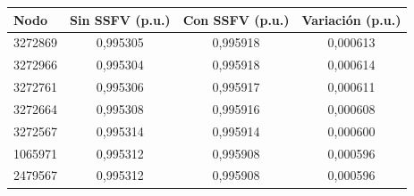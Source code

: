 \begin{tabular}{lccc}
\toprule
\textbf{Nodo} & \textbf{Sin SSFV (p.u.)} & \textbf{Con SSFV (p.u.)} & \textbf{Variación (p.u.)} \\
\midrule
3272869 & 0,995305 & 0,995918 & 0,000613 \\
3272966 & 0,995304 & 0,995918 & 0,000614 \\
3272761 & 0,995306 & 0,995917 & 0,000611 \\
3272664 & 0,995308 & 0,995916 & 0,000608 \\
3272567 & 0,995314 & 0,995914 & 0,000600 \\
1065971 & 0,995312 & 0,995908 & 0,000596 \\
2479567 & 0,995312 & 0,995908 & 0,000596 \\
\bottomrule
\end{tabular}
